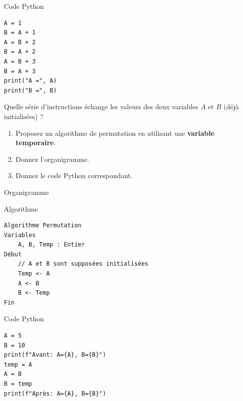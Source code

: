 \documentclass[12pt,a4paper]{article}
\begin{document}
\begin{ansbox}{Code Python}
\begin{verbatim}
A = 1
B = A + 1
A = B + 2
B = A + 2
A = B + 3
B = A + 3
print("A =", A)
print("B =", B)
\end{verbatim}
\end{ansbox}

\begin{exobox}[title=\textbf{Exercice 2 — Permutation des valeurs de 2 variables}]
Quelle série d’instructions échange les valeurs des deux variables $A$ et $B$ (déjà initialisées) ?
\end{exobox}

\begin{taskbox}
\begin{enumerate}
  \item Proposez un algorithme de permutation en utilisant une \textbf{variable temporaire}.
  \item Donnez l’organigramme.
  \item Donnez le code Python correspondant.
\end{enumerate}
\end{taskbox}

\begin{ansbox}{Organigramme}
\end{ansbox}

\begin{ansbox}{Algorithme}
\begin{verbatim}
Algorithme Permutation
Variables
    A, B, Temp : Entier
Début
    // A et B sont supposées initialisées
    Temp <- A
    A <- B
    B <- Temp
Fin
\end{verbatim}
\end{ansbox}

\begin{ansbox}{Code Python}
\begin{verbatim}
A = 5
B = 10
print(f"Avant: A={A}, B={B}")
temp = A
A = B
B = temp
print(f"Après: A={A}, B={B}")
\end{verbatim}
\end{ansbox}
\end{document}
